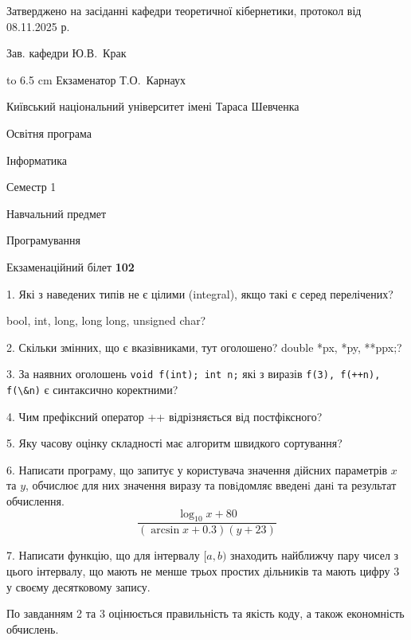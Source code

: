 \documentclass[12pt, ukrainian]{article}
\def\code#1{\Verb!#1!}
\begin{document}
{\smallskip\smallskip \begin {scriptsize} Затверджено на засіданні кафедри теоретичної кібернетики, протокол   від   08.11.2025 р.\par\smallskip\smallskip\smallskip\smallskip
{\parbox {6.5 cm} {Зав. кафедри \dotfill Ю.В.~Крак}}\hspace {0.7cm} {\hbox to 6.5 cm { Екзаменатор \dotfill Т.О.~Карнаух}} \end{scriptsize}}
\vspace{0.9cm}
{{\begin {scriptsize}\par
{ \center  Київський національний університет імені Тараса Шевченка \par}
{\parbox {5 cm}{Освітня програма \hfill}{\parbox {7 cm}{Інформатика\hfill}}\parbox {6 cm}{\hfill Семестр 1}}\par
{\parbox {5 cm} {Навчальний предмет \hfill}\parbox {7 cm}{Програмування \hfill}\parbox {6cm}{\hfill}\par}\vspace{-15pt} \end{scriptsize}}{\center Екзаменаційний білет \No \textbf { 102 }\par}}
{%
1. Які з наведених типів не є цілими (integral), якщо такі є серед перелічених?

bool, int, long, long long, unsigned char?
\par
\vspace{2mm}
2. Скільки змінних, що є вказівниками, тут оголошено?
double *px, *py, **ppx;?
\par
\vspace{2mm}
3. За наявних оголошень \code{void f(int); int n;} які з виразів \code{f(3), f(++n), f(\&n)} є синтаксично коректними?
\par
\vspace{2mm}
4. Чим префіксний оператор ++ відрізняється від постфіксного?
\par
\vspace{2mm}
5. Яку часову оцінку складності має алгоритм швидкого сортування?
\par
\vspace{2mm}
6. Написати програму, що запитує у користувача значення дійсних параметрів $x$ та $y$, обчислює для них значення виразу та повiдомляє введенi данi та результат обчислення.
$$\frac{\log_{10} x + 80}{(\arcsin x + 0.3) (y + 23)}$$ 

\par
7. Написати функцію, що для інтервалу $[a, b)$ знаходить найближчу пару чисел з цього інтервалу, що мають не менше трьох простих дільників та мають цифру 3 у своєму десятковому запису.

По завданням 2 та 3 оцінюється правильність та якість коду, а також економність обчислень.

}
\end{document}
